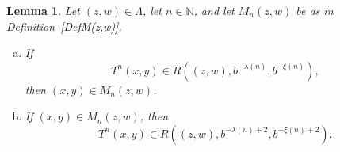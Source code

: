 \documentclass[12pt]{article}
\newtheorem{lemma}[definition]{Lemma}
\theoremstyle{remark}
\numberwithin{equation}{section}
\renewcommand{\Bbb}[1]{\mathbb{#1}}
\newcommand{\N}{{\Bbb N}}         %
\newcommand{\0}{\mathbf{0}}
\begin{document}
 \begin{lemma} \label{upper}
 Let $(z,w) \in \Lambda$, let $n \in \N$, and let $M_{n}(z,w)$ be as in Definition~\ref{DefM(z,w)}.
 \begin{enumerate}[(a)]
 \item If
 \begin{equation*}
     T^{n}(x,y) \in R\left((z,w), b^{-\lambda(n)}, b^{-\xi(n)}\right),
 \end{equation*}
then $(x,y) \in M_n(z,w)$.
 \item If $(x,y) \in  M_{n}(z,w)$, then
 \begin{equation*}
     T^{n}(x,y) \in R\left((z,w), b^{-\lambda(n)+2}, b^{-\xi(n)+2}\right).
 \end{equation*}
\end{enumerate}
 \end{lemma}
\end{document}
